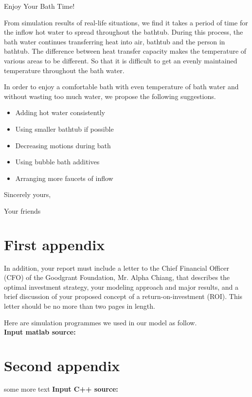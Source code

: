\documentclass{mcmthesis}
\begin{document}




\newpage

\begin{letter}{Enjoy Your Bath Time!}

From simulation results of real-life situations, we find it takes a period of time for the inflow hot water to spread throughout the bathtub. During this process, the bath water continues transferring heat into air, bathtub and the person in bathtub. The difference between heat transfer capacity makes the temperature of various areas to be different. So that it is difficult to get an evenly maintained temperature throughout the bath water.

In order to enjoy a comfortable bath with even temperature of bath water and without wasting too much water, we propose the following suggestions.

\begin{itemize}[leftmargin=*]
\item Adding hot water consistently
\item Using smaller bathtub if possible
\item Decreasing motions during bath
\item Using bubble bath additives
\item Arranging more faucets of inflow
\end{itemize}

\vspace{\parskip}

Sincerely yours,

Your friends

\end{letter}

\newpage

\begin{appendices}

\section{First appendix}

In addition, your report must include a letter to the Chief Financial Officer (CFO) of the Goodgrant Foundation, Mr. Alpha Chiang, that describes the optimal investment strategy, your modeling approach and major results, and a brief discussion of your proposed concept of a return-on-investment (ROI). This letter should be no more than two pages in length.

Here are simulation programmes we used in our model as follow.\\

\textbf{\textcolor[rgb]{0.98,0.00,0.00}{Input matlab source:}}


\section{Second appendix}

some more text \textcolor[rgb]{0.98,0.00,0.00}{\textbf{Input C++ source:}}


\end{appendices}
\end{document}
